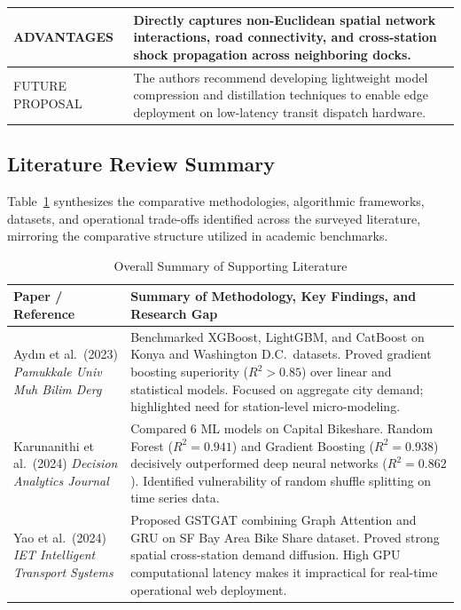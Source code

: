 \documentclass[12pt, a4paper]{article}
\renewcommand{\_}{\textunderscore\allowbreak}
\begin{document}
\clearpage

\begin{center}
\small
\renewcommand{\arraystretch}{1.3}
\noindent\begin{tabularx}{\textwidth}{|>{\centering\arraybackslash}p{3.8cm}|>{\raggedright\arraybackslash}X|}
\hline
ADVANTAGES & Directly captures non-Euclidean spatial network interactions, road connectivity, and cross-station shock propagation across neighboring docks. \\ \hline
FUTURE PROPOSAL & The authors recommend developing lightweight model compression and distillation techniques to enable edge deployment on low-latency transit dispatch hardware. \\ \hline
\end{tabularx}
\vspace{0.2cm}
\label{tab:lit_review_yao}
\end{center}

\subsection{Literature Review Summary}
Table~\ref{tab:lit_summary} synthesizes the comparative methodologies, algorithmic frameworks, datasets, and operational trade-offs identified across the surveyed literature, mirroring the comparative structure utilized in academic benchmarks.

\begin{table}[H]
\centering
\small
\renewcommand{\arraystretch}{1.3}
\noindent\begin{tabularx}{\textwidth}{|>{\raggedright\arraybackslash}p{3.8cm}|>{\raggedright\arraybackslash}X|}
\hline
\textbf{Paper / Reference} & \textbf{Summary of Methodology, Key Findings, and Research Gap} \\ \hline
Ayd{\i}n et al.\ (2023) \newline \textit{Pamukkale Univ Muh Bilim Derg} & Benchmarked XGBoost, LightGBM, and CatBoost on Konya and Washington D.C.\ datasets. Proved gradient boosting superiority ($R^2 > 0.85$) over linear and statistical models. Focused on aggregate city demand; highlighted need for station-level micro-modeling. \\ \hline
Karunanithi et al.\ (2024) \newline \textit{Decision Analytics Journal} & Compared 6 ML models on Capital Bikeshare. Random Forest ($R^2 = 0.941$) and Gradient Boosting ($R^2 = 0.938$) decisively outperformed deep neural networks ($R^2 = 0.862$). Identified vulnerability of random shuffle splitting on time series data. \\ \hline
Yao et al.\ (2024) \newline \textit{IET Intelligent Transport Systems} & Proposed GSTGAT combining Graph Attention and GRU on SF Bay Area Bike Share dataset. Proved strong spatial cross-station demand diffusion. High GPU computational latency makes it impractical for real-time operational web deployment. \\ \hline
\end{tabularx}
\caption{Overall Summary of Supporting Literature}
\label{tab:lit_summary}
\end{table}
\end{document}
